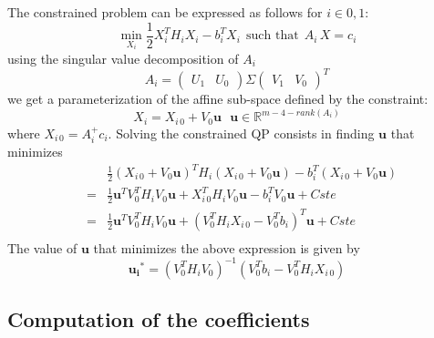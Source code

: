 \documentclass {article}
\newcommand\real{\mathbb{R}}
\begin{document}
The constrained problem can be expressed as follows for $i\in{0,1}$:
$$
\min_{X_i} \frac{1}{2}X_i^TH_iX_i - b_i^TX_i \ \ \mbox{such that}\ \ A_i\,X=c_i
$$
using the singular value decomposition of $A_i$
$$
A_i = \left(\begin{array}{cc}U_1 & U_0\end{array}\right) \Sigma
\left(\begin{array}{cc}V_1 & V_0\end{array}\right)^T
$$
we get a parameterization of the affine sub-space defined by the constraint:
$$
X_i = X_{i\,0} + V_0\mathbf{u}\ \ \ \mathbf{u}\in\real^{m-4-rank(A_i)}
$$
where $X_{i\,0}=A_i^{+}c_i$.
Solving the constrained QP consists in finding $\mathbf{u}$ that minimizes
\begin{eqnarray*}
&&\frac{1}{2}( X_{i\,0} + V_0\mathbf{u})^TH_i( X_{i\,0} + V_0\mathbf{u}) - b_i^T( X_{i\,0} + V_0\mathbf{u})\\
&=& \frac{1}{2}\mathbf{u}^TV_0^TH_iV_0\mathbf{u} + X_{i\,0}^T H_i V_0\mathbf{u} - b_i^TV_0\mathbf{u} + Cste \\
&=& \frac{1}{2}\mathbf{u}^TV_0^TH_iV_0\mathbf{u} + (V_0^T H_i X_{i\,0}  - V_0^Tb_i)^T\mathbf{u} + Cste \\
\end{eqnarray*}
The value of $\mathbf{u}$ that minimizes the above expression is given by
$$
\mathbf{u_i}^{*} = (V_0^TH_iV_0)^{-1}(V_0^Tb_i  - V_0^T H_i X_{i\,0})
$$
\subsection {Computation of the coefficients}
\end{document}
